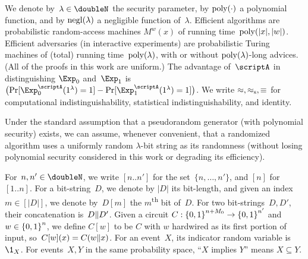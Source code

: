 We denote by~${\lambda\in\doubleN}$ the security parameter,
by $\operatorname{poly}({\cdot})$ a polynomial function, and
by $\operatorname{negl}(\lambda)$ a negligible function of~$\lambda$.
Efficient algorithms are probabilistic random-access machines $M^w(x)$ of running time~$\operatorname{poly}(|x|,|w|)$.
Efficient adversaries (in interactive experiments) are probabilistic Turing machines of (total) running time~$\operatorname{poly}(\lambda)$,
with or without $\operatorname{poly}(\lambda)$-long advices.
(All of the proofs in this work are uniform.)
The advantage of~$\scriptA$ in distinguishing $\Exp_0$ and~$\Exp_1$ is
${\bigl(\Pr[\Exp_0^\scriptA(1^\lambda)=1]-\Pr[\Exp_1^\scriptA(1^\lambda)=1]\bigr)}$.
We write ${\approx},{\approx_{\textup{s}}},{\equiv}$ for computational indistinguishability, statistical indistinguishability, and identity.

Under the standard assumption that a pseudorandom generator (with polynomial security) exists,
we can assume, whenever convenient, that a randomized algorithm uses a uniformly random $\lambda$-bit string as its randomness (without losing polynomial security considered in this work or degrading its efficiency).

For~${n,n'\in\doubleN}$, we write $[n..n']$ for the set~$\{n,\dots,n'\}$,
and $[n]$ for~$[1..n]$.
For a bit-string~$D$, we denote by $|D|$ its bit-length,
and given an index~${m\in[|D|]}$, we denote by~$D[m]$ the $m$\textsuperscript{th} bit of~$D$.
For two bit-strings~$D,D'$, their concatenation is~${D{\parallel} D'}$.
Given a circuit ${C:{\{0,1\}}^{n+M_0}\to{\{0,1\}}^{n'}}$ and ${w\in{\{0,1\}}^n}$, we define $C[w]$ to be $C$ with $w$ hardwired as its first portion of input,
so~${C[w](x)=C(w{\parallel} x)}$.
For an event~$X$, its indicator random variable is~$\1_X$.
For events~$X,Y$ in the same probability space, ``$X$ implies $Y$'' means ${X\subseteq Y}$.
